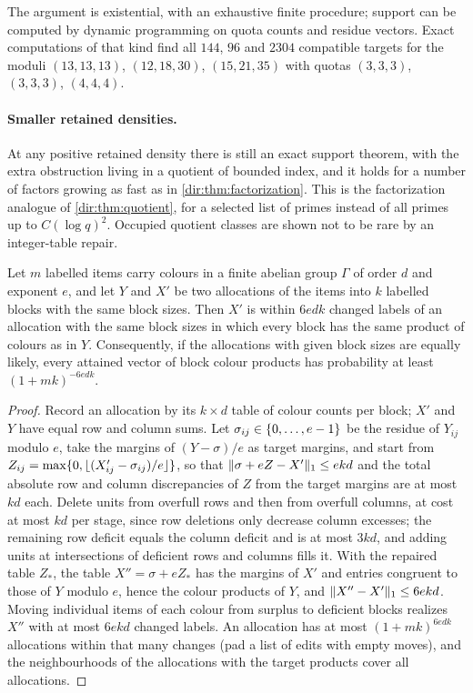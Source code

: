 The argument is existential, with an exhaustive finite procedure; support can be computed by dynamic
programming on quota counts and residue vectors. Exact computations of that kind find all $144$, $96$
and $2304$ compatible targets for the moduli $(13,13,13)$, $(12,18,30)$, $(15,21,35)$ with quotas
$(3,3,3)$, $(3,3,3)$, $(4,4,4)$.

\paragraph{Smaller retained densities.}
At any positive retained density there is still an exact support theorem, with the extra obstruction
living in a quotient of bounded index, and it holds for a number of factors growing as fast as in
\cref{dir:thm:factorization}. This is the factorization analogue of \cref{dir:thm:quotient}, for a
selected list of primes instead of all primes up to $C(\log q)^2$. Occupied quotient classes are shown
not to be rare by an integer-table repair.

\begin{lemma}\label{dir:lem:repair}
Let $m$ labelled items carry colours in a finite abelian group $\Gamma$ of order $d$ and exponent
$e$, and let $Y$ and $X'$ be two allocations of the items into $k$ labelled blocks with the same block
sizes. Then $X'$ is within $6edk$ changed labels of an allocation with the same block sizes in which
every block has the same product of colours as in $Y$. Consequently, if the allocations with given
block sizes are equally likely, every attained vector of block colour products has probability at
least $(1+mk)^{-6edk}$.
\end{lemma}
\begin{proof}
Record an allocation by its $k\times d$ table of colour counts per block; $X'$ and $Y$ have equal row
and column sums. Let $\sigma_{ij}\in\{0,\dots,e-1\}$ be the residue of $Y_{ij}$ modulo $e$, take the
margins of $(Y-\sigma)/e$ as target margins, and start from
$Z_{ij}=\max\{0,\lfloor(X'_{ij}-\sigma_{ij})/e\rfloor\}$, so that $\lVert\sigma+eZ-X'\rVert_1\le ekd$ and the
total absolute row and column discrepancies of $Z$ from the target margins are at most $kd$ each.
Delete units from overfull rows and then from overfull columns, at cost at most $kd$ per stage, since
row deletions only decrease column excesses; the remaining row deficit equals the column deficit and
is at most $3kd$, and adding units at intersections of deficient rows and columns fills it. With the
repaired table $Z_*$, the table $X''=\sigma+eZ_*$ has the margins of $X'$ and entries congruent to those
of $Y$ modulo $e$, hence the colour products of $Y$, and $\lVert X''-X'\rVert_1\le6ekd$. Moving individual
items of each colour from surplus to deficient blocks realizes $X''$ with at most $6ekd$ changed
labels. An allocation has at most $(1+mk)^{6edk}$ allocations within that many changes (pad a list of
edits with empty moves), and the neighbourhoods of the allocations with the target products cover all
allocations.
\end{proof}

